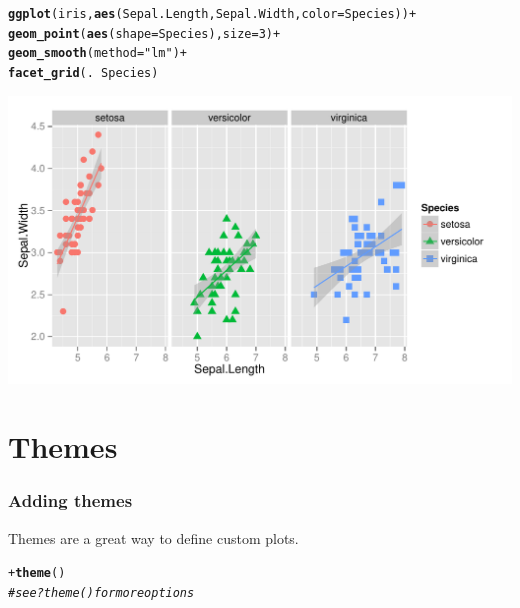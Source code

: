 \documentclass{beamer}\usepackage[]{graphicx}\usepackage[]{color}
\makeatletter
\newcommand{\hlnum}[1]{\textcolor[rgb]{0.686,0.059,0.569}{#1}}%
\newcommand{\hlstr}[1]{\textcolor[rgb]{0.192,0.494,0.8}{#1}}%
\newcommand{\hlcom}[1]{\textcolor[rgb]{0.678,0.584,0.686}{\textit{#1}}}%
\newcommand{\hlopt}[1]{\textcolor[rgb]{0,0,0}{#1}}%
\newcommand{\hlstd}[1]{\textcolor[rgb]{0.345,0.345,0.345}{#1}}%
\newcommand{\hlkwc}[1]{\textcolor[rgb]{0.333,0.667,0.333}{#1}}%
\newcommand{\hlkwd}[1]{\textcolor[rgb]{0.737,0.353,0.396}{\textbf{#1}}}%
\newenvironment{kframe}{%
 \def\at@end@of@kframe{}%
 \ifinner\ifhmode%
  \def\at@end@of@kframe{\end{minipage}}%
  \begin{minipage}{\columnwidth}%
 \fi\fi%
 \def\FrameCommand##1{\hskip\@totalleftmargin \hskip-\fboxsep
 \colorbox{shadecolor}{##1}\hskip-\fboxsep
     \hskip-\linewidth \hskip-\@totalleftmargin \hskip\columnwidth}%
 \MakeFramed {\advance\hsize-\width
   \@totalleftmargin\z@ \linewidth\hsize
   \@setminipage}}%
 {\par\unskip\endMakeFramed%
 \at@end@of@kframe}
\newenvironment{knitrout}{}{} %
\makeatother
\begin{document}
\begin{frame}[fragile]
\begin{knitrout}\footnotesize
{}\color{fgcolor}\begin{kframe}
\begin{alltt}
\hlkwd{ggplot}\hlstd{(iris,} \hlkwd{aes}\hlstd{(Sepal.Length, Sepal.Width,} \hlkwc{color} \hlstd{= Species))} \hlopt{+}
\hlkwd{geom_point}\hlstd{(}\hlkwd{aes}\hlstd{(}\hlkwc{shape} \hlstd{= Species),} \hlkwc{size} \hlstd{=} \hlnum{3}\hlstd{)} \hlopt{+}
\hlkwd{geom_smooth}\hlstd{(}\hlkwc{method} \hlstd{=} \hlstr{"lm"}\hlstd{)} \hlopt{+}
\hlkwd{facet_grid}\hlstd{(.} \hlopt{~} \hlstd{Species)}
\end{alltt}
\end{kframe}

{\centering \includegraphics[width=.75\linewidth]{figure/adding_stats2_} 

}



\end{knitrout}

\end{frame}


\section*{Themes}
\frame{\sectionpage}


\begin{frame}[fragile]
\frametitle{Adding themes}
Themes are a great way to define custom plots.
\begin{knitrout}\footnotesize
{}\color{fgcolor}\begin{kframe}
\begin{alltt}
\hlopt{+}\hlkwd{theme}\hlstd{()}
\hlcom{# see ?theme() for more options}
\end{alltt}
\end{kframe}
\end{knitrout}

\end{frame}
\end{document}

